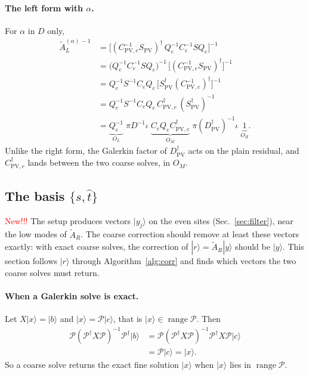 \documentclass[11pt,a4paper]{article}
\numberwithin{equation}{section}
\newcommand{\dg}{^{\dagger}}
\newcommand{\Dpv}{D_{\mathrm{PV}}}
\newcommand{\Spv}{S_{\mathrm{PV}}}
\newcommand{\AR}{\tilde A_{R}}
\newcommand{\AL}{\tilde A_{L}}
\newcommand{\Pro}{\mathcal P}
\newcommand{\Ce}{C_{e}}
\newcommand{\Cpve}{C_{\mathrm{PV},e}}
\newcounter{alg}
\begin{document}
\paragraph{The left form with $\alpha$.} For $\alpha$ in $D$ only,
\begin{align}
\AL^{(\alpha)\,-1}&=\big[(\Cpve^{-1}\Spv)\dg\,Q_e^{-1}\Ce^{-1}SQ_e\big]^{-1}\nonumber\\
&=\big(Q_e^{-1}\Ce^{-1}SQ_e\big)^{-1}\,\big[(\Cpve^{-1}\Spv)\dg\big]^{-1}\nonumber\\
&=Q_e^{-1}S^{-1}\Ce Q_e\,\big[\Spv\dg(\Cpve^{-1})\dg\big]^{-1}\nonumber\\
&=Q_e^{-1}S^{-1}\Ce Q_e\,\Cpve\dg\,(\Spv\dg)^{-1}\nonumber\\
&=\underbrace{Q_e^{-1}}_{O_L}\;\pi D^{-1}\iota\;\underbrace{\Ce Q_e\Cpve\dg}_{O_M}\;
\pi(\Dpv\dg)^{-1}\iota\;\underbrace{1}_{O_R} .
\end{align}
Unlike the right form, the Galerkin factor of $\Dpv\dg$ acts on the plain residual, and
$\Cpve\dg$ lands between the two coarse solves, in $O_M$.

\subsection{The basis $\{s,\hat t\}$}
\label{sec:lifts}
\textcolor{red}{New!!!} The setup produces vectors $|y_j\rangle$ on the even sites (Sec.~\ref{sec:filter}), near the
low modes of $\AR$. The coarse correction should remove at least these vectors exactly: with
exact coarse solves, the correction of $|r\rangle=\AR|y\rangle$ should be $|y\rangle$. This section
follows $|r\rangle$ through Algorithm~\ref{alg:corr} and finds which vectors the two coarse solves
must return.

\paragraph{When a Galerkin solve is exact.} Let $X|x\rangle=|b\rangle$ and $|x\rangle=\Pro|c\rangle$,
that is $|x\rangle\in\operatorname{range}\Pro$. Then
\begin{align}
\Pro(\Pro\dg X\Pro)^{-1}\Pro\dg|b\rangle&=\Pro(\Pro\dg X\Pro)^{-1}\Pro\dg X\Pro|c\rangle\nonumber\\
&=\Pro|c\rangle=|x\rangle .
\label{eq:galexact}
\end{align}
So a coarse solve returns the exact fine solution $|x\rangle$ when $|x\rangle$ lies in
$\operatorname{range}\Pro$.
\end{document}
